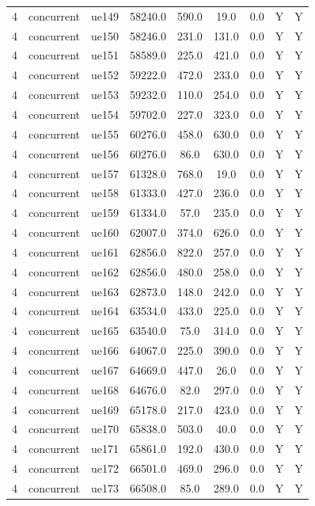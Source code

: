 \begin{table}[ht]
\begin{tabular}{|c|c|c|c|c|c|c|c|c|}
4 & concurrent & ue149 & 58240.0 & 590.0 & 19.0 & 0.0 & Y & Y \\
4 & concurrent & ue150 & 58246.0 & 231.0 & 131.0 & 0.0 & Y & Y \\
4 & concurrent & ue151 & 58589.0 & 225.0 & 421.0 & 0.0 & Y & Y \\
4 & concurrent & ue152 & 59222.0 & 472.0 & 233.0 & 0.0 & Y & Y \\
4 & concurrent & ue153 & 59232.0 & 110.0 & 254.0 & 0.0 & Y & Y \\
4 & concurrent & ue154 & 59702.0 & 227.0 & 323.0 & 0.0 & Y & Y \\
4 & concurrent & ue155 & 60276.0 & 458.0 & 630.0 & 0.0 & Y & Y \\
4 & concurrent & ue156 & 60276.0 & 86.0 & 630.0 & 0.0 & Y & Y \\
4 & concurrent & ue157 & 61328.0 & 768.0 & 19.0 & 0.0 & Y & Y \\
4 & concurrent & ue158 & 61333.0 & 427.0 & 236.0 & 0.0 & Y & Y \\
4 & concurrent & ue159 & 61334.0 & 57.0 & 235.0 & 0.0 & Y & Y \\
4 & concurrent & ue160 & 62007.0 & 374.0 & 626.0 & 0.0 & Y & Y \\
4 & concurrent & ue161 & 62856.0 & 822.0 & 257.0 & 0.0 & Y & Y \\
4 & concurrent & ue162 & 62856.0 & 480.0 & 258.0 & 0.0 & Y & Y \\
4 & concurrent & ue163 & 62873.0 & 148.0 & 242.0 & 0.0 & Y & Y \\
4 & concurrent & ue164 & 63534.0 & 433.0 & 225.0 & 0.0 & Y & Y \\
4 & concurrent & ue165 & 63540.0 & 75.0 & 314.0 & 0.0 & Y & Y \\
4 & concurrent & ue166 & 64067.0 & 225.0 & 390.0 & 0.0 & Y & Y \\
4 & concurrent & ue167 & 64669.0 & 447.0 & 26.0 & 0.0 & Y & Y \\
4 & concurrent & ue168 & 64676.0 & 82.0 & 297.0 & 0.0 & Y & Y \\
4 & concurrent & ue169 & 65178.0 & 217.0 & 423.0 & 0.0 & Y & Y \\
4 & concurrent & ue170 & 65838.0 & 503.0 & 40.0 & 0.0 & Y & Y \\
4 & concurrent & ue171 & 65861.0 & 192.0 & 430.0 & 0.0 & Y & Y \\
4 & concurrent & ue172 & 66501.0 & 469.0 & 296.0 & 0.0 & Y & Y \\
4 & concurrent & ue173 & 66508.0 & 85.0 & 289.0 & 0.0 & Y & Y \\

\end{tabular}
\end{table}
